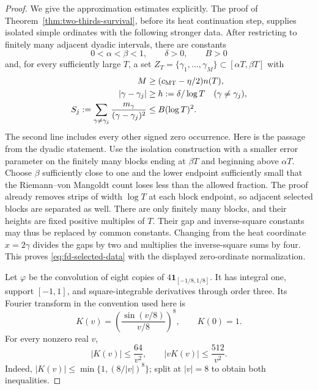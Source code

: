 \begin{proof}
We give the approximation estimates explicitly. The proof of
Theorem~\ref{thm:two-thirds-survival}, before its heat continuation
step, supplies isolated simple ordinates with the following stronger
data. After restricting to finitely many adjacent dyadic intervals,
there are constants
\[
 0<\alpha<\beta<1,\qquad \delta>0,\qquad B>0
\]
and, for every sufficiently large \(T\), a set
\(Z_T=\{\gamma_1,\ldots,\gamma_M\}\subset[\alpha T,\beta T]\)
with
\begin{equation}\label{eq:fd-selected-data}
 \begin{split}
 M&\ge(c_{\rm MT}-\eta/2)n(T),\\
 |\gamma-\gamma_j|&\ge h:=\delta/\log T
     \quad(\gamma\ne\gamma_j),\\
 S_j:=\sum_{\gamma\ne\gamma_j}
           \frac{m_\gamma}{(\gamma-\gamma_j)^2}
     &\le B(\log T)^2.
 \end{split}
\end{equation}
The second line includes every other signed zero occurrence.
Here is the passage from the dyadic statement. Use the isolation
construction with a smaller error parameter on the finitely many
blocks ending at \(\beta T\) and beginning above \(\alpha T\).
Choose \(\beta\) sufficiently close to one and the lower endpoint
sufficiently small that the Riemann--von Mangoldt count loses less
than the allowed fraction. The proof already removes strips of width
\(\log T\) at each block endpoint, so adjacent selected blocks are
separated as well. There are only finitely many blocks, and their
heights are fixed positive multiples of \(T\). Their gap and
inverse-square constants may thus be replaced by common constants.
Changing from the heat coordinate \(x=2\gamma\) divides the gaps by
two and multiplies the inverse-square sums by four. This proves
\eqref{eq:fd-selected-data} with the displayed zero-ordinate
normalization.

Let \(\varphi\) be the convolution of eight copies of
\(4\mathbf1_{[-1/8,1/8]}\). It has integral one, support
\([-1,1]\), and square-integrable derivatives through order three.
Its Fourier transform in the convention used here is
\[
 K(v)=\left(\frac{\sin(v/8)}{v/8}\right)^8,
 \qquad K(0)=1.
\]
For every nonzero real \(v\),
\begin{equation}\label{eq:fd-bump-decay}
 |K(v)|\le\frac{64}{v^2},\qquad
 |vK(v)|\le\frac{512}{v^2}.
\end{equation}
Indeed, \(|K(v)|\le\min\{1,(8/|v|)^8\}\); split at
\(|v|=8\) to obtain both inequalities.


\end{proof}
